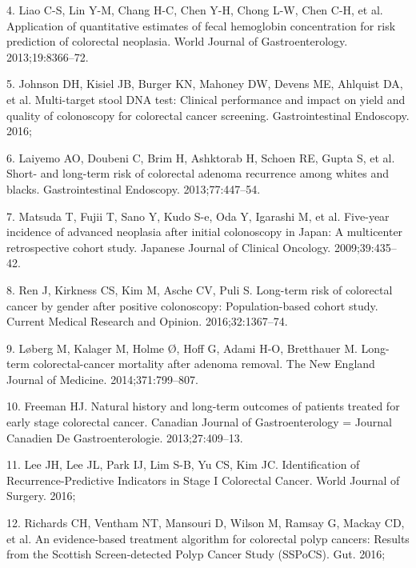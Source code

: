 \documentclass[12pt,]{article}
\begin{document}
\hypertarget{ref-liao_application_2013}{}
4. Liao C-S, Lin Y-M, Chang H-C, Chen Y-H, Chong L-W, Chen C-H, et al.
Application of quantitative estimates of fecal hemoglobin concentration
for risk prediction of colorectal neoplasia. World Journal of
Gastroenterology. 2013;19:8366--72.

\hypertarget{ref-johnson_multi-target_2016}{}
5. Johnson DH, Kisiel JB, Burger KN, Mahoney DW, Devens ME, Ahlquist DA,
et al. Multi-target stool DNA test: Clinical performance and impact on
yield and quality of colonoscopy for colorectal cancer screening.
Gastrointestinal Endoscopy. 2016;

\hypertarget{ref-laiyemo_short-_2013}{}
6. Laiyemo AO, Doubeni C, Brim H, Ashktorab H, Schoen RE, Gupta S, et
al. Short- and long-term risk of colorectal adenoma recurrence among
whites and blacks. Gastrointestinal Endoscopy. 2013;77:447--54.

\hypertarget{ref-matsuda_five-year_2009}{}
7. Matsuda T, Fujii T, Sano Y, Kudo S-e, Oda Y, Igarashi M, et al.
Five-year incidence of advanced neoplasia after initial colonoscopy in
Japan: A multicenter retrospective cohort study. Japanese Journal of
Clinical Oncology. 2009;39:435--42.

\hypertarget{ref-ren_long-term_2016}{}
8. Ren J, Kirkness CS, Kim M, Asche CV, Puli S. Long-term risk of
colorectal cancer by gender after positive colonoscopy: Population-based
cohort study. Current Medical Research and Opinion. 2016;32:1367--74.

\hypertarget{ref-loberg_long-term_2014}{}
9. Løberg M, Kalager M, Holme Ø, Hoff G, Adami H-O, Bretthauer M.
Long-term colorectal-cancer mortality after adenoma removal. The New
England Journal of Medicine. 2014;371:799--807.

\hypertarget{ref-freeman_natural_2013}{}
10. Freeman HJ. Natural history and long-term outcomes of patients
treated for early stage colorectal cancer. Canadian Journal of
Gastroenterology = Journal Canadien De Gastroenterologie.
2013;27:409--13.

\hypertarget{ref-lee_identification_2016}{}
11. Lee JH, Lee JL, Park IJ, Lim S-B, Yu CS, Kim JC. Identification of
Recurrence-Predictive Indicators in Stage I Colorectal Cancer. World
Journal of Surgery. 2016;

\hypertarget{ref-richards_evidence-based_2016}{}
12. Richards CH, Ventham NT, Mansouri D, Wilson M, Ramsay G, Mackay CD,
et al. An evidence-based treatment algorithm for colorectal polyp
cancers: Results from the Scottish Screen-detected Polyp Cancer Study
(SSPoCS). Gut. 2016;
\end{document}
